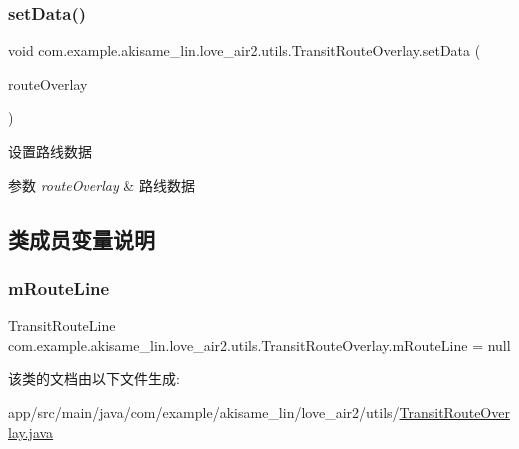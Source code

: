 \subsubsection{\texorpdfstring{setData()}{setData()}}
{\footnotesize\ttfamily void com.\+example.\+akisame\+\_\+lin.\+love\+\_\+air2.\+utils.\+Transit\+Route\+Overlay.\+set\+Data (\begin{DoxyParamCaption}\item[{Transit\+Route\+Line}]{route\+Overlay }\end{DoxyParamCaption})\hspace{0.3cm}{\ttfamily [inline]}}

设置路线数据


\begin{DoxyParams}{参数}
{\em route\+Overlay} & 路线数据 \\
\hline
\end{DoxyParams}


\subsection{类成员变量说明}
\mbox{\label{classcom_1_1example_1_1akisame__lin_1_1love__air2_1_1utils_1_1_transit_route_overlay_ab902ab9ad543922552443b9a3e09baf3}} 
\subsubsection{\texorpdfstring{mRouteLine}{mRouteLine}}
{\footnotesize\ttfamily Transit\+Route\+Line com.\+example.\+akisame\+\_\+lin.\+love\+\_\+air2.\+utils.\+Transit\+Route\+Overlay.\+m\+Route\+Line = null\hspace{0.3cm}{\ttfamily [private]}}



该类的文档由以下文件生成\+:\begin{DoxyCompactItemize}
\item 
app/src/main/java/com/example/akisame\+\_\+lin/love\+\_\+air2/utils/\mbox{\hyperlink{_transit_route_overlay_8java}{Transit\+Route\+Overlay.\+java}}\end{DoxyCompactItemize}
